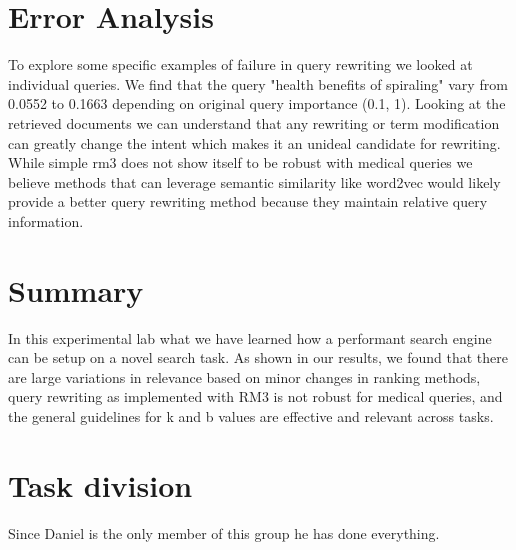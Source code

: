 \documentclass[11pt]{article}
\begin{document}
\section{Error Analysis}
To explore some specific examples of failure in query rewriting we looked at individual queries. We find that the query "health benefits of spiraling" vary from 0.0552 to 0.1663 depending on original query importance (0.1, 1). Looking at the retrieved documents we can understand that any rewriting or term modification can greatly change the intent which makes it an unideal candidate for rewriting. While simple rm3 does not show itself to be robust with medical queries we believe methods that can leverage semantic similarity like word2vec would likely provide a better query rewriting method because they maintain relative query information. 
\section{Summary}
In this experimental lab what we have learned how a performant search engine can be setup on a novel search task. As shown in our results, we found that there are large variations in relevance based on minor changes in ranking methods, query rewriting as implemented with RM3 is not robust for medical queries, and the general guidelines for k and b values are effective and relevant across tasks.  
\section{Task division}
Since Daniel is the only member of this group he has done everything. 
\end{document}
